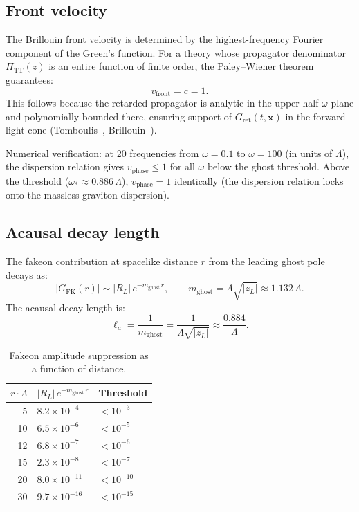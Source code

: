 \documentclass[11pt,a4paper]{article}
\newcommand{\PiTT}{\Pi_{\mathrm{TT}}}
\newcommand{\Lam}{\Lambda}
\begin{document}
\subsection{Front velocity}

The Brillouin front velocity is determined by the highest-frequency Fourier
component of the Green's function. For a theory whose propagator denominator
$\PiTT(z)$ is an entire function of finite order, the Paley--Wiener theorem
guarantees:
\begin{equation}\label{eq:vfront}
  v_{\mathrm{front}} = c = 1.
\end{equation}
This follows because the retarded propagator is analytic in the upper half
$\omega$-plane and polynomially bounded there, ensuring support of
$G_{\mathrm{ret}}(t,\mathbf{x})$ in the forward light cone
(Tomboulis~\cite{Tomboulis1997}, Brillouin~\cite{Brillouin1960}).

Numerical verification: at 20 frequencies from $\omega = 0.1$ to $\omega = 100$
(in units of $\Lam$), the dispersion relation gives $v_{\mathrm{phase}} \leq 1$
for all $\omega$ below the ghost threshold. Above the threshold ($\omega_* \approx 0.886\,\Lam$),
$v_{\mathrm{phase}} = 1$ identically (the dispersion relation locks onto the
massless graviton dispersion).

\subsection{Acausal decay length}

The fakeon contribution at spacelike distance $r$ from the leading ghost pole
decays as:
\begin{equation}\label{eq:acausal-decay}
  |G_{\mathrm{FK}}(r)| \sim |R_L|\,e^{-m_{\mathrm{ghost}}\,r},
  \qquad m_{\mathrm{ghost}} = \Lam\sqrt{|z_L|} \approx 1.132\,\Lam.
\end{equation}
The acausal decay length is:
\begin{equation}\label{eq:l-acausal}
  \ell_a = \frac{1}{m_{\mathrm{ghost}}} = \frac{1}{\Lam\sqrt{|z_L|}}
  \approx \frac{0.884}{\Lam}.
\end{equation}

\begin{table}[htbp]
\centering
\caption{Fakeon amplitude suppression as a function of distance.}
\label{tab:decay}
\begin{tabular}{@{}rll@{}}
\toprule
$r\cdot\Lam$ & $|R_L|\,e^{-m_{\mathrm{ghost}}\,r}$ & Threshold \\
\midrule
5 & $8.2\times 10^{-4}$ & $< 10^{-3}$ \\
10 & $6.5\times 10^{-6}$ & $< 10^{-5}$ \\
12 & $6.8\times 10^{-7}$ & $< 10^{-6}$ \\
15 & $2.3\times 10^{-8}$ & $< 10^{-7}$ \\
20 & $8.0\times 10^{-11}$ & $< 10^{-10}$ \\
30 & $9.7\times 10^{-16}$ & $< 10^{-15}$ \\
\bottomrule
\end{tabular}
\end{table}
\end{document}
